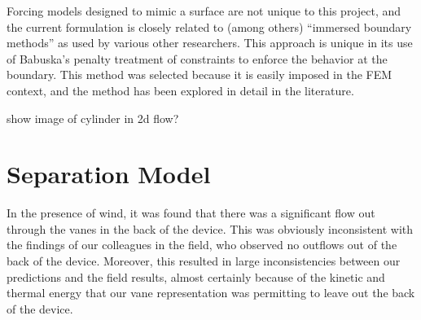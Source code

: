 Forcing models designed to mimic a surface
are not unique to this project, and the current formulation is
 closely related to (among others)
``immersed boundary methods'' as used by various other
researchers\cite{doi:10.1146/annurev.fluid.37.061903.175743}. 
This approach is unique in its use of Babuska's penalty treatment of
constraints\cite{1973fempen,ZAMM:ZAMM19880680925} to enforce the
behavior at the boundary. This method was selected because it is easily
imposed in the FEM context, and the method has been explored in detail
in the literature.

show image of cylinder in 2d flow?



\section{Separation Model}

In the presence of wind, it was found that there was a significant flow
out through the vanes in the back of the device. This was obviously
inconsistent with the findings of our colleagues in the field, who
observed no outflows out of the back of the device. Moreover, this resulted
in large inconsistencies between our predictions and the field results,
almost certainly because of the kinetic and thermal energy that our vane
representation was permitting to leave out the back of the device.  

